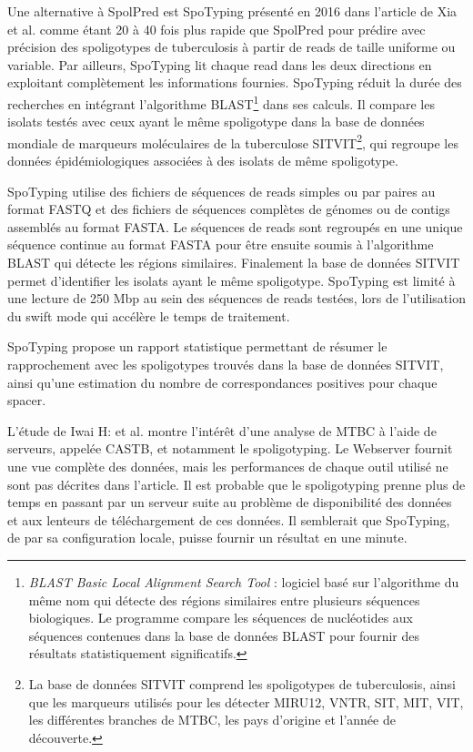 \documentclass[twoside,a4paper,11pt,frenchb,openany]{report}
\begin{document}
Une alternative à SpolPred est SpoTyping présenté en 2016 dans l'article \cite{xia} de Xia et al. comme étant 20 à 40 fois plus rapide que SpolPred pour prédire avec précision des spoligotypes de tuberculosis à partir de reads de taille uniforme ou variable. Par ailleurs, SpoTyping lit chaque read dans les deux directions en exploitant complètement les informations fournies. SpoTyping réduit la durée des recherches en intégrant l'algorithme BLAST\footnote{\textit{BLAST Basic Local Alignment Search Tool} : logiciel basé sur l'algorithme du même nom qui détecte des régions similaires entre plusieurs séquences biologiques. Le programme compare les séquences de nucléotides aux séquences contenues dans la base de données BLAST pour fournir des résultats statistiquement significatifs.} dans ses calculs. Il compare les isolats testés avec ceux ayant le même spoligotype dans la base de données mondiale de marqueurs moléculaires de la tuberculose SITVIT\footnote{La base de données SITVIT comprend les spoligotypes de tuberculosis, ainsi que les marqueurs utilisés pour les détecter MIRU12, VNTR, SIT, MIT, VIT, les différentes branches de MTBC, les pays d'origine et l'année de découverte.}, qui regroupe les données épidémiologiques associées à des isolats de même spoligotype.

SpoTyping utilise des fichiers de séquences de reads simples ou par paires au format FASTQ et des fichiers de séquences complètes de génomes ou de contigs assemblés au format FASTA. Le séquences de reads sont regroupés en une unique séquence continue au format FASTA pour être ensuite soumis à l'algorithme BLAST qui détecte les régions similaires. Finalement la base de données SITVIT permet d'identifier les isolats ayant le même spoligotype. SpoTyping est limité à une lecture de 250 Mbp au sein des séquences de reads testées, lors de l'utilisation du swift mode qui accélère le temps de traitement.

SpoTyping propose un rapport statistique permettant de résumer le rapprochement avec les spoligotypes trouvés dans la base de données SITVIT, ainsi qu'une estimation du nombre de correspondances positives pour chaque spacer.

L'étude de Iwai H: et al. \cite{iwai} montre l'intérêt d'une analyse de MTBC à l'aide de serveurs, appelée CASTB, et notamment le spoligotyping. Le Webserver fournit une vue complète des données, mais les performances de chaque outil utilisé ne sont pas décrites dans l'article. Il est probable que le spoligotyping prenne plus de temps en passant par un serveur suite au problème de disponibilité des données et aux lenteurs de téléchargement de ces données. Il semblerait que SpoTyping, de par sa configuration locale, puisse fournir un résultat en une minute.
\end{document}
